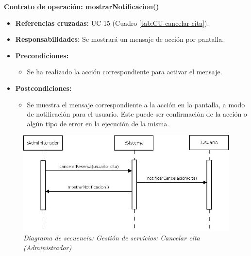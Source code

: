 \textbf{Contrato de operación: mostrarNotificacion()}
\begin{itemize}
\item \textbf{Referencias cruzadas:} UC-15 (Cuadro \ref{tab:CU-cancelar-cita}).
\item \textbf{Responsabilidades:} Se mostrará un mensaje de acción por pantalla.
\item \textbf{Precondiciones:} 
 \begin{itemize}
\item Se ha realizado la acción correspondiente para activar el mensaje.
\end {itemize}
\item \textbf{Postcondiciones:} 
 \begin{itemize}
\item Se muestra el mensaje correspondiente a la acción en la pantalla, a modo de notificación para el usuario. Este puede ser confirmación de la acción o algún tipo de error en la ejecución de la misma.
\end {itemize}
\end {itemize}


\vspace{10mm}

\begin{figure}[H]
\centering
  \includegraphics[scale=.50]{img/secuencias/gestion-servicios-cancelar-cita-por-parte-de-admin.jpeg}
  \caption{\textit{Diagrama de secuencia: Gestión de servicios: Cancelar cita (Administrador)}}
  \label{fig:secuencia-gestion-servicios-cancelar-cita-por-parte-de-admin}
\end{figure}

